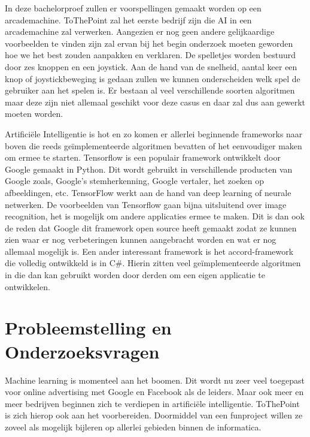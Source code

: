 In deze bachelorproef zullen er voorspellingen gemaakt worden op een arcademachine. ToThePoint zal het eerste bedrijf zijn die AI in een arcademachine zal verwerken. Aangezien er nog geen andere gelijkaardige voorbeelden te vinden zijn zal ervan bij het begin onderzoek moeten geworden hoe we het best zouden aanpakken en verklaren. De spelletjes worden bestuurd door zes knoppen en een joystick. Aan de hand van de snelheid, aantal keer een knop of joystickbeweging is gedaan zullen we kunnen onderscheiden welk spel de gebruiker aan het spelen is. Er bestaan al veel verschillende soorten algoritmen maar deze zijn niet allemaal geschikt voor deze casus en daar zal dus aan gewerkt moeten worden. 

Artificiële Intelligentie is hot en zo komen er allerlei beginnende frameworks naar boven die reeds geïmplementeerde algoritmen bevatten of het eenvoudiger maken om ermee te starten. 
Tensorflow is een populair framework ontwikkelt door Google gemaakt in Python. Dit wordt gebruikt in verschillende producten van Google zoals, Google's stemherkenning, Google vertaler, het zoeken op afbeeldingen, etc.
TensorFlow werkt aan de hand van deep learning of neurale netwerken. De voorbeelden van Tensorflow gaan bijna uitsluitend over image recognition, het is mogelijk om andere applicaties ermee te maken. Dit is dan ook de reden dat Google dit framework open source heeft gemaakt zodat ze kunnen zien waar er nog verbeteringen kunnen aangebracht worden en wat er nog allemaal mogelijk is.
Een ander interessant framework is het accord-framework \autocite{accord} die volledig ontwikkeld is in C\#. Hierin zitten veel geïmplementeerde algoritmen in die dan kan gebruikt worden door derden om een eigen applicatie te ontwikkelen. 



\section{Probleemstelling en Onderzoeksvragen}
\label{sec:onderzoeksvragen}


Machine learning is momenteel aan het boomen. Dit wordt nu zeer veel toegepast voor online advertising met Google en Facebook als de leiders. Maar ook meer en meer bedrijven beginnen zich te verdiepen in artificiële intelligentie. ToThePoint is zich hierop ook aan het voorbereiden. Doormiddel van een funproject willen ze zoveel als mogelijk bijleren op allerlei gebieden binnen de informatica. 

